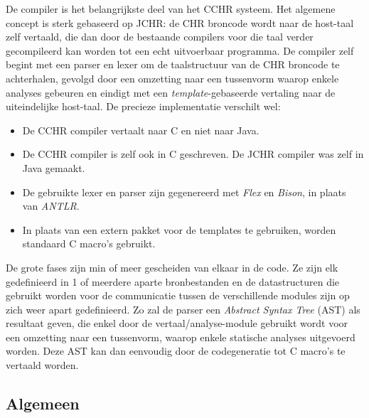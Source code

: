 De compiler is het belangrijkste deel van het CCHR systeem. Het algemene concept is sterk gebaseerd op JCHR: de CHR broncode wordt naar de host-taal zelf vertaald, die dan door de bestaande compilers voor die taal verder gecompileerd kan worden tot een echt uitvoerbaar programma. De compiler zelf begint met een parser en lexer om de taalstructuur van de CHR broncode te achterhalen, gevolgd door een omzetting naar een tussenvorm waarop enkele analyses gebeuren en eindigt met een {\em template}-gebaseerde vertaling naar de uiteindelijke host-taal. De precieze implementatie verschilt wel: \begin{itemize}
  \item De CCHR compiler vertaalt naar C en niet naar Java.
  \item De CCHR compiler is zelf ook in C geschreven. De JCHR compiler was zelf in Java gemaakt.
  \item De gebruikte lexer en parser zijn gegenereerd met {\em Flex} en {\em Bison}, in plaats van {\em ANTLR}.
  \item In plaats van een extern pakket voor de templates te gebruiken, worden standaard C macro's gebruikt.
 \end{itemize}
 
De grote fases zijn min of meer gescheiden van elkaar in de code. Ze zijn elk gedefinieerd in 1 of meerdere aparte bronbestanden en de datastructuren die gebruikt worden voor de communicatie tussen de verschillende modules zijn op zich weer apart gedefinieerd. Zo zal de parser een {\em Abstract Syntax Tree} (AST) als resultaat geven, die enkel door de vertaal/analyse-module gebruikt wordt voor een omzetting naar een tussenvorm, waarop enkele statische analyses uitgevoerd worden. Deze AST kan dan eenvoudig door de codegeneratie tot C macro's te vertaald worden.

\subsection{Algemeen} \label{sec:comp-werking}

